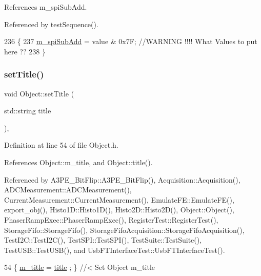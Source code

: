 References m\+\_\+spi\+Sub\+Add.



Referenced by test\+Sequence().


\begin{DoxyCode}
236                                                        \{
237   \hyperlink{classFePGA_a4f2f5d175aeb6dcaf497f81d2f075411}{m\_spiSubAdd} = value & 0x7F;  \textcolor{comment}{//WARNING !!!! What Values to put here ??}
238 \}
\end{DoxyCode}
\mbox{\label{classObject_a89557dbbad5bcaa02652f5d7fa35d20f}} 
\subsubsection{\texorpdfstring{set\+Title()}{setTitle()}}
{\footnotesize\ttfamily void Object\+::set\+Title (\begin{DoxyParamCaption}\item[{std\+::string}]{title }\end{DoxyParamCaption})\hspace{0.3cm}{\ttfamily [inline]}, {\ttfamily [inherited]}}



Definition at line 54 of file Object.\+h.



References Object\+::m\+\_\+title, and Object\+::title().



Referenced by A3\+P\+E\+\_\+\+Bit\+Flip\+::\+A3\+P\+E\+\_\+\+Bit\+Flip(), Acquisition\+::\+Acquisition(), A\+D\+C\+Measurement\+::\+A\+D\+C\+Measurement(), Current\+Measurement\+::\+Current\+Measurement(), Emulate\+F\+E\+::\+Emulate\+F\+E(), export\+\_\+obj(), Histo1\+D\+::\+Histo1\+D(), Histo2\+D\+::\+Histo2\+D(), Object\+::\+Object(), Phaser\+Ramp\+Exec\+::\+Phaser\+Ramp\+Exec(), Register\+Test\+::\+Register\+Test(), Storage\+Fifo\+::\+Storage\+Fifo(), Storage\+Fifo\+Acquisition\+::\+Storage\+Fifo\+Acquisition(), Test\+I2\+C\+::\+Test\+I2\+C(), Test\+S\+P\+I\+::\+Test\+S\+P\+I(), Test\+Suite\+::\+Test\+Suite(), Test\+U\+S\+B\+::\+Test\+U\+S\+B(), and Usb\+F\+T\+Interface\+Test\+::\+Usb\+F\+T\+Interface\+Test().


\begin{DoxyCode}
54 \{ \hyperlink{classObject_affbeea1953eb5163573b92fad8f75727}{m\_title} = \hyperlink{classObject_a73a0f1a41828fdd8303dd662446fb6c3}{title} ; \} \textcolor{comment}{//< Set Object m\_title}
\end{DoxyCode}
\mbox{\label{classObject_aae534cc9d982bcb9b99fd505f2e103a5}} 
